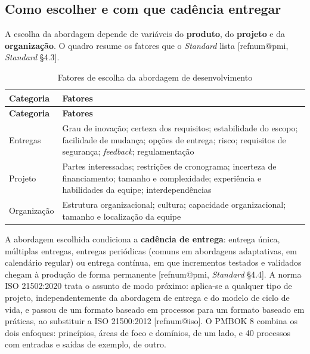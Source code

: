 \documentclass[12pt,a4paper,article,oneside,english,brazil]{abntex2}
\makeatletter
\newcommand{\fontetab}[1]{\par\vspace{3pt}{\small\noindent Fonte: #1\par}}
\newcommand{\refnum}[1]{\csname refnum@#1\endcsname}
\newcommand{\cit}[1]{[\refnum{#1}]}
\makeatother
\begin{document}
\subsection{Como escolher e com que cadência entregar}

A escolha da abordagem depende de variáveis do \textbf{produto}, do \textbf{projeto} e da \textbf{organização}. O quadro resume os fatores que o \textit{Standard} lista [\refnum{pmi}, \textit{Standard} §4.3].

\begingroup\SingleSpacing\small
\begin{longtable}{@{}>{\raggedright\arraybackslash}p{}>{\raggedright\arraybackslash}p{}@{}}
\caption{Fatores de escolha da abordagem de desenvolvimento}\label{tab:t5}\\
\hline
\textbf{Categoria} & \textbf{Fatores}\\
\hline
\endfirsthead
\hline
\textbf{Categoria} & \textbf{Fatores}\\
\hline
\endhead
\hline
\endfoot
\hline
\endlastfoot
Entregas & Grau de inovação; certeza dos requisitos; estabilidade do escopo; facilidade de mudança; opções de entrega; risco; requisitos de segurança; \textit{feedback}; regulamentação\\[3pt]
Projeto & Partes interessadas; restrições de cronograma; incerteza de financiamento; tamanho e complexidade; experiência e habilidades da equipe; interdependências\\[3pt]
Organização & Estrutura organizacional; cultura; capacidade organizacional; tamanho e localização da equipe\\[3pt]
\end{longtable}
\endgroup
\fontetab{Elaborado pelos autores (2026), com base em \cit{pmi}.}

A abordagem escolhida condiciona a \textbf{cadência de entrega}: entrega única, múltiplas entregas, entregas periódicas (comuns em abordagens adaptativas, em calendário regular) ou entrega contínua, em que incrementos testados e validados chegam à produção de forma permanente [\refnum{pmi}, \textit{Standard} §4.4]. A norma ISO 21502:2020 trata o assunto de modo próximo: aplica-se a qualquer tipo de projeto, independentemente da abordagem de entrega e do modelo de ciclo de vida, e passou de um formato baseado em processos para um formato baseado em práticas, ao substituir a ISO 21500:2012 [\refnum{iso}]. O PMBOK 8 combina os dois enfoques: princípios, áreas de foco e domínios, de um lado, e 40 processos com entradas e saídas de exemplo, de outro.
\end{document}
